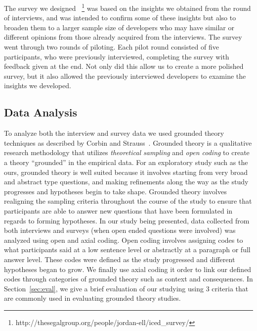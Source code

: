 \documentclass[conference]{IEEEtran}
\begin{document}
The  survey we designed ~\footnote{http://thesegalgroup.org/people/jordan-ell/iced\_survey/}
was based on the insights we obtained from the round of interviews, and was intended to confirm some of these insights but also to broaden them to a larger sample size of developers who may have similar
or different opinions from those already acquired from the interviews. The survey went through two rounds of
piloting. Each pilot round consisted of five participants, who were previously interviewed, completing the survey
with feedback given at the end. Not only did this allow us to create a more polished survey, but it also allowed 
the previously interviewed developers to examine the insights we developed.

\subsection{Data Analysis}
To analyze both the interview and survey data we used grounded theory techniques as described by Corbin and Strauss~\cite{Corbin:1998:SP}.
Grounded theory is a qualitative research methodology that utilizes \textit{theoretical sampling} and
\textit{open coding} to create a theory ``grounded'' in the empirical data. For an exploratory study such as
the ours, grounded theory is well suited because it involves starting from very broad and abstract type questions, and
making refinements along the way as the study progresses and hypotheses begin to take shape. Grounded theory involves
realigning the sampling criteria throughout the course of the study to ensure that participants are able to answer new
questions that have been formulated in regards to forming hypotheses. In our study being presented, data collected from
both interviews and surveys (when open ended questions were involved) was analyzed using open and axial coding. Open coding involves
assigning codes to what participants said at a low sentence level or abstractly at a paragraph or full answer level. These
codes were defined as the study progressed and different hypotheses began to grow. We finally use axial coding it order to
link our defined codes through categories of grounded theory such as context and consequences. 
In Section~\ref{sec:eval}, we give a brief evaluation of our studying using 
3 criteria that are commonly used in evaluating grounded theory studies.
\end{document}
